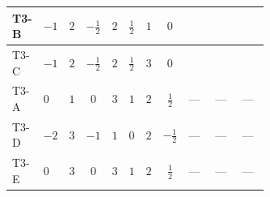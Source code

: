 \documentclass[8pt]{article}
\begin{document}
\begin{landscape}
\begin{longtable}{@{}llcccccc >{\raggedright\arraybackslash}p{0.21\linewidth} >{\raggedright\arraybackslash}p{0.21\linewidth} >{\raggedright\arraybackslash}p{0.21\linewidth}@{}}
T3-B & $-1$ & $2$ & $-\frac{1}{2}$ & $2$ & $\frac{1}{2}$ & $1$ & $0$ & \scriptsize\adjustbox{max width=\linewidth}{$\begin{gathered} {\lambda_{T3}} \left(6 \operatorname{Tr}\!\left({Y_d}\,\left({Y_d}\right)^{\dagger}\right)+2 \operatorname{Tr}\!\left({Y_e}\,\left({Y_e}\right)^{\dagger}\right)+6 \operatorname{Tr}\!\left({Y_u}\,\left({Y_u}\right)^{\dagger}\right)+\frac{{\lambda_{12}^{\rm Adj}}}{6}+\frac{2 {\lambda_{H1}^{\rm Adj}}}{3}+2 {\lambda_{H2}^{\rm Adj}}\right)\end{gathered}$} & \scriptsize\adjustbox{max width=\linewidth}{$\begin{gathered} -4 {\lambda_{H H^\dagger S_1^\dagger S_2^\dagger}^{\rm Cross}} \left({\lambda_{H^\dagger H^\dagger S_1^\dagger S_1^\dagger}}\right)^{*}\end{gathered}$} & \scriptsize\adjustbox{max width=\linewidth}{$\begin{gathered} +4 {\lambda_{S_1 S_1^{\dagger 2}S_2^\dagger}} \left({\lambda_{H^\dagger H^\dagger S_1^\dagger S_1^\dagger}}\right)^{*}\end{gathered}$} \\
\midrule
T3-C & $-1$ & $2$ & $-\frac{1}{2}$ & $2$ & $\frac{1}{2}$ & $3$ & $0$ & \scriptsize\adjustbox{max width=\linewidth}{$\begin{gathered} {\lambda_{T3}} \left(6 \operatorname{Tr}\!\left({Y_d}\,\left({Y_d}\right)^{\dagger}\right)+2 \operatorname{Tr}\!\left({Y_e}\,\left({Y_e}\right)^{\dagger}\right)+6 \operatorname{Tr}\!\left({Y_u}\,\left({Y_u}\right)^{\dagger}\right)+\frac{{\lambda_{12}^{\rm Adj}}}{6}+\frac{2 {\lambda_{H1}^{\rm Adj}}}{3}+2 {\lambda_{H2}^{\rm Adj}}\right)\end{gathered}$} & \scriptsize\adjustbox{max width=\linewidth}{$\begin{gathered} -4 {\lambda_{H H^\dagger S_1^\dagger S_2^\dagger}^{\rm Cross}} \left({\lambda_{H^\dagger H^\dagger S_1^\dagger S_1^\dagger}}\right)^{*}\end{gathered}$} & \scriptsize\adjustbox{max width=\linewidth}{$\begin{gathered} +4 {\lambda_{S_1 S_1^{\dagger 2}S_2^\dagger}} \left({\lambda_{H^\dagger H^\dagger S_1^\dagger S_1^\dagger}}\right)^{*}\end{gathered}$} \\
\midrule
T3-A & $0$ & $1$ & $0$ & $3$ & $1$ & $2$ & $\frac{1}{2}$ & --- & --- & --- \\
\midrule
T3-D & $-2$ & $3$ & $-1$ & $1$ & $0$ & $2$ & $-\frac{1}{2}$ & --- & --- & --- \\
\midrule
T3-E & $0$ & $3$ & $0$ & $3$ & $1$ & $2$ & $\frac{1}{2}$ & --- & --- & --- \\
\midrule
\bottomrule
\end{longtable}
\clearpage

\end{landscape}
\end{document}
